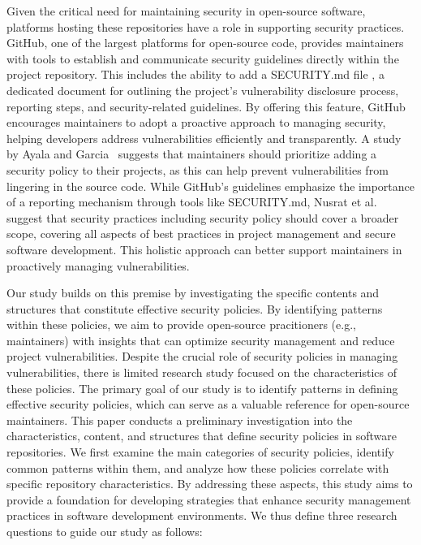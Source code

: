 
Given the critical need for maintaining security in open-source software, platforms hosting these repositories have a role in supporting security practices. GitHub, one of the largest platforms for open-source code, provides maintainers with tools to establish and communicate security guidelines directly within the project repository. This includes the ability to add a SECURITY.md file \cite{GitMd}, a dedicated document for outlining the project's vulnerability disclosure process, reporting steps, and security-related guidelines. By offering this feature, GitHub encourages maintainers to adopt a proactive approach to managing security, helping developers address vulnerabilities efficiently and transparently. A study by Ayala and Garcia~\cite{10190609} suggests that maintainers should prioritize adding a security policy to their projects, as this can help prevent vulnerabilities from lingering in the source code. While GitHub's guidelines emphasize the importance of a reporting mechanism through tools like SECURITY.md, Nusrat et al.~\cite{zahan2023softwaresecuritypracticesyield} suggest that security practices including security policy should cover a broader scope, covering all aspects of best practices in project management and secure software development. This holistic approach can better support maintainers in proactively managing vulnerabilities. 




Our study builds on this premise by investigating the specific contents and structures that constitute effective security policies. By identifying patterns within these policies, we aim to provide open-source pracitioners (e.g., maintainers) with insights that can optimize security management and reduce project vulnerabilities. Despite the crucial role of security policies in managing vulnerabilities, there is limited research study focused on the characteristics of these policies. The primary goal of our study is to identify patterns in defining effective security policies, which can serve as a valuable reference for open-source maintainers. This paper conducts a preliminary investigation into the characteristics, content, and structures that define security policies in software repositories. We first examine the main categories of security policies, identify common patterns within them, and analyze how these policies correlate with specific repository characteristics. By addressing these aspects, this study aims to provide a foundation for developing strategies that enhance security management practices in software development environments. We thus define three research questions to guide our study as follows:


